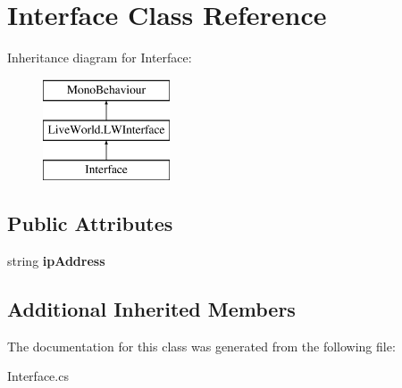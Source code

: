 \hypertarget{class_interface}{}\section{Interface Class Reference}
\label{class_interface}
Inheritance diagram for Interface\+:\begin{figure}[H]
\begin{center}
\leavevmode
\includegraphics[height=3.000000cm]{class_interface}
\end{center}
\end{figure}
\subsection*{Public Attributes}
\begin{DoxyCompactItemize}
\item 
\hypertarget{class_interface_aef5223ae4a813051a04a201cb2b4dacb}{}string {\bfseries ip\+Address}\label{class_interface_aef5223ae4a813051a04a201cb2b4dacb}

\end{DoxyCompactItemize}
\subsection*{Additional Inherited Members}


The documentation for this class was generated from the following file\+:\begin{DoxyCompactItemize}
\item 
Interface.\+cs\end{DoxyCompactItemize}
